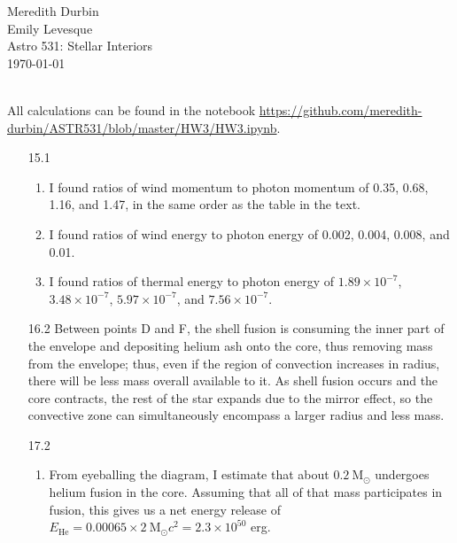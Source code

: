 \documentclass[11pt]{article}
\newcommand\msol{\mathrm{M}_\odot}
\begin{document}
\begin{flushright}Meredith Durbin\\
Emily Levesque\\
Astro 531: Stellar Interiors\\
\today\\

\end{flushright}

 \\[6pt]

All calculations can be found in the notebook \url{https://github.com/meredith-durbin/ASTR531/blob/master/HW3/HW3.ipynb}.

\begin{enumerate}

\item [15.1]
	\begin{enumerate}
	
    \item I found ratios of wind momentum to photon momentum of 0.35, 0.68, 1.16, and 1.47, in the same order as the table in the text.
    
    \item I found ratios of wind energy to photon energy of 0.002, 0.004, 0.008, and 0.01.
    
    \item I found ratios of thermal energy to photon energy of $1.89\times10^{-7}$, $3.48\times10^{-7}$, $5.97\times10^{-7}$, and $7.56\times10^{-7}$.
    
    \end{enumerate}

\item [16.2] 
	Between points D and F, the shell fusion is consuming the inner part of the envelope and depositing helium ash onto the core, thus removing mass from the envelope; thus, even if the region of convection increases in radius, there will be less mass overall available to it. As shell fusion occurs and the core contracts, the rest of the star expands due to the mirror effect, so the convective zone can simultaneously encompass a larger radius and less mass.

\item [17.2]
	\begin{enumerate}
	
    \item From eyeballing the diagram, I estimate that about $0.2~\msol$ undergoes helium fusion in the core. Assuming that all of that mass participates in fusion, this gives us a net energy release of $E_\mathrm{He} = 0.00065\times 2~\msol c^2 = 2.3\times10^{50}$ erg.
    

\end{enumerate}
\end{enumerate}
\end{document}
